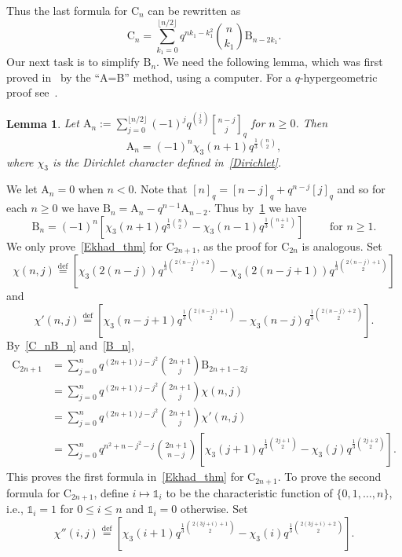 \documentclass[12pt,a4paper,reqno]{amsart}
\theoremstyle{plain}
\newtheorem{lemma}[theorem]{Lemma}
\theoremstyle{definition}
\newcommand{\defin}{\overset{\mathrm{def}}{=}}
\newcommand{\1}{\mathds{1}}
\newcommand{\A}{\mathrm{A}}
\newcommand{\B}{\mathrm{B}}
\begin{document}
Thus the last formula for $\mathrm{C}_n$ can be rewritten  as
\begin{equation}\label{C_nB_n}
        \mathrm{C}_{n}=\sum_{k_1=0}^{\lfloor n/2\rfloor }q^{nk_1-k_1^2}\binom{n}{k_1}\B_{n-2k_1}. 
\end{equation}
Our next task  is to simplify $\B_n$. We need the following lemma, which was first proved in~\cite[Lemma 2]{Ekhad} by the ``A=B'' method, using a computer. For a $q$-hypergeometric proof see~\cite{Warnaar}. 
\begin{lemma}\label{Ekahd_lemma} Let 
$\A_n:=\sum_{j=0}^{\lfloor n/2\rfloor }(-1)^jq^{\binom{j}{2}}{n-j \brack j}_q
$ for $n\geq 0$. Then 
\[
\A_n=(-1)^n\chi_3(n+1)q^{\frac{1}{3}\binom{n}{2}}
,
\] where $\chi_3$ is the Dirichlet character defined in~\cref{Dirichlet}. 
    \end{lemma}
We let $\A_n=0$ when $n<0$.  Note that $[n]_q=[n-j]_q+q^{n-j}[j]_q$ and so for each $n\geq 0$ we have 
$\B_n=\A_n-q^{n-1}\A_{n-2}$. Thus by~\cref{Ekahd_lemma} we have
\begin{equation}\label{B_n}
\B_n=(-1)^n\left[\chi_3(n+1)q^{\frac{1}{3}\binom{n}{2}}-\chi_3(n-1)q^{\frac{1}{3}\binom{n+1}{2}}\right]\qquad \text{ for }n\geq 1.
\end{equation}
We only prove~\cref{Ekhad_thm} for $\mathrm{C}_{2n+1}$, as the proof for 
$\mathrm{C}_{2n}$ is analogous. 
Set \[
\chi(n,j)\defin        
\left[        \chi_3(2(n-j))q^{\frac{1}{3}\binom{2(n-j)+2}{2}}-\chi_3(2(n-j+1))q^{\frac{1}{3}\binom{2(n-j)+1}{2}}
\right]
\]
and 
\[
\chi'(n,j)\defin
\left[\chi_3(n-j+1)q^{\frac{1}{3}\binom{2(n-j)+1}{2}}-\chi_3(n-j)q^{\frac{1}{3}\binom{2(n-j)+2}{2}}\right].
\]
By~\cref{C_nB_n} and~\cref{B_n},
\begin{equation*}
\begin{split}
        \mathrm{C}_{2n+1}&=\sum_{j=0}^n q^{(2n+1)j-j^2}\binom{2n+1}{j}\B_{2n+1-2j}\\
        &=\sum_{j=0}^n q^{(2n+1)j-j^2}\binom{2n+1}{j}
        \chi(n,j)
        \\
        &=\sum_{j=0}^n q^{(2n+1)j-j^2}\binom{2n+1}{j}
		\chi'(n,j)        
        \\
        &=\sum_{j=0}^n q^{n^2+n-j^2-j}\binom{2n+1}{n-j}\left[\chi_3(j+1)q^{\frac{1}{3}\binom{2j+1}{2}}-\chi_3(j)q^{\frac{1}{3}\binom{2j+2}{2}}\right]
.\end{split}
\end{equation*}
This proves the first formula in~\cref{Ekhad_thm} for $\mathrm{C}_{2n+1}$. To prove the second formula for $\mathrm{C}_{2n+1}$, define $i
\mapsto \1_i$ to be the characteristic function of $\{0,1,\dots,n\}$, i.e., $\1_i=1$ for $0\leq i\leq n$ and $\1_i=0$ otherwise. 
Set
\[
\chi''(i,j)\defin
\left[\chi_3(i+1)q^{\frac{1}{3}\binom{2(3j+i)+1}{2}}-\chi_3(i)q^{\frac{1}{3}\binom{2(3j+i)+2}{2}}\right].
\]
\end{document}
